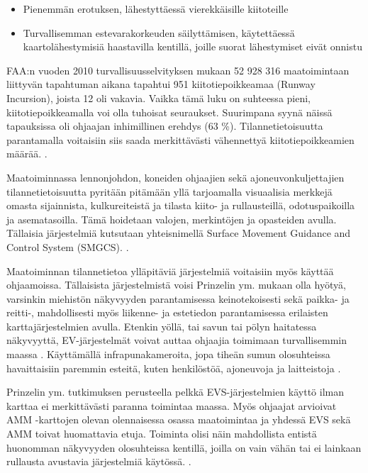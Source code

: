 \documentclass[utf8,bachelor,manualbib]{gradu3}
\begin{document}
\begin{itemize}
\item Pienemmän erotuksen, lähestyttäessä vierekkäisille kiitoteille
\item Turvallisemman estevarakorkeuden säilyttämisen, käytettäessä kaartolähestymisiä haastavilla kentillä, joille suorat lähestymiset eivät onnistu
\end{itemize}

FAA:n vuoden 2010 turvallisuusselvityksen mukaan 52 928 316 maatoimintaan liittyvän tapahtuman aikana tapahtui 951 kiitotiepoikkeamaa (Runway Incursion), joista 12 oli vakavia. Vaikka tämä luku on suhteessa pieni, kiitotiepoikkeamalla voi olla tuhoisat seuraukset. Suurimpana syynä näissä tapauksissa oli ohjaajan inhimillinen erehdys (63 \%). Tilannetietoisuutta parantamalla voitaisiin siis saada merkittävästi vähennettyä kiitotiepoikkeamien määrää. \citep{prinzel2013}.

Maatoiminnassa lennonjohdon, koneiden ohjaajien sekä ajoneuvonkuljettajien tilannetietoisuutta pyritään pitämään yllä tarjoamalla visuaalisia merkkejä omasta sijainnista, kulkureiteistä ja tilasta kiito- ja rullausteillä, odotuspaikoilla ja asematasoilla. Tämä hoidetaan valojen, merkintöjen ja opasteiden avulla. Tällaisia järjestelmiä kutsutaan yhteisnimellä Surface Movement Guidance and Control System (SMGCS). \citep{prinzel2013}.

Maatoiminnan tilannetietoa ylläpitäviä järjestelmiä voitaisiin myös käyttää ohjaamoissa. Tällaisista järjestelmistä voisi Prinzelin ym. \citeyearpar{prinzel2013} mukaan olla hyötyä, varsinkin miehistön näkyvyyden parantamisessa keinotekoisesti sekä paikka- ja reitti-,  mahdollisesti myös liikenne- ja estetiedon parantamisessa erilaisten karttajärjestelmien avulla. Etenkin yöllä, tai savun tai pölyn haitatessa näkyvyyttä, EV-järjestelmät voivat auttaa ohjaajia toimimaan turvallisemmin maassa \citep{prinzel2013}. Käyttämällä infrapunakameroita, jopa tiheän sumun olosuhteissa havaittaisiin paremmin esteitä, kuten henkilöstöä, ajoneuvoja ja laitteistoja \citep{beiergemperlein2004}.

Prinzelin ym. \citeyearpar{prinzel2013} tutkimuksen perusteella pelkkä EVS-järjestelmien käyttö ilman karttaa ei merkittävästi paranna toimintaa maassa. Myös ohjaajat arvioivat AMM -karttojen olevan olennaisessa osassa maatoimintaa ja yhdessä EVS sekä AMM toivat huomattavia etuja. Toiminta olisi näin mahdollista entistä huonomman näkyvyyden olosuhteissa kentillä, joilla on vain vähän tai ei lainkaan rullausta avustavia järjestelmiä käytössä. \citep{prinzel2013}.
\end{document}
